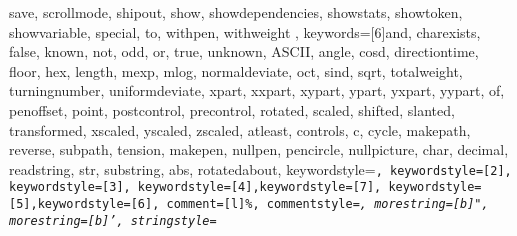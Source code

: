 {{        save, scrollmode, shipout, show, showdependencies,%
        showstats, showtoken, showvariable, special, to, withpen,%
        withweight
    }, %
    keywords=[6]{and, charexists, false, known, not, odd, or, true, unknown,%
        ASCII, angle, cosd, directiontime, floor, hex, length,%
        mexp, mlog, normaldeviate, oct, sind, sqrt, totalweight,%
        turningnumber, uniformdeviate, xpart, xxpart, xypart, ypart, yxpart, yypart,%
        of, penoffset, point, postcontrol, precontrol, rotated,%
        scaled, shifted, slanted, transformed, xscaled, yscaled, zscaled,%
        atleast, controls, c, cycle, makepath, reverse, subpath, tension,%
        makepen, nullpen, pencircle, nullpicture,%
    char, decimal, readstring, str, substring, abs, rotatedabout},%
    keywordstyle=\color{mpkeyword}\tt, keywordstyle=[2]\tt\color{mpinternalconstants},%
    keywordstyle=[3]\tt\color{mpdef}, keywordstyle=[4]\tt\color{mptype},keywordstyle=[7]\tt\color{mpdef},%
    keywordstyle=[5]\tt\color{mfcmd},keywordstyle=[6]\tt\color{mpexp},%
    comment=[l]{\%},%
    commentstyle=\it\small\color{texcomment},
    morestring=[b]",
    morestring=[b]',
    stringstyle=\color{mpstring}%
}

